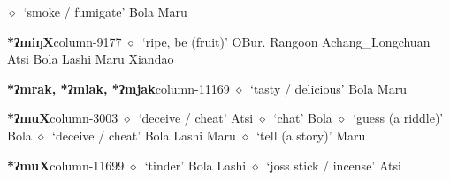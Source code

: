          $\diamond$~`smoke / fumigate'
         Bola 
\hspace{1ex}
         Maru 
  \item {\footnotesize \textbf{*ʔmiŋX}}{\tiny column-9177}
         $\diamond$~`ripe, be (fruit)'
         OBur. 
\hspace{1ex}
         Rangoon 
\hspace{1ex}
         Achang\_Longchuan 
\hspace{1ex}
         Atsi 
\hspace{1ex}
         Bola 
\hspace{1ex}
         Lashi 
\hspace{1ex}
         Maru 
\hspace{1ex}
         Xiandao 
  \item {\footnotesize \textbf{*ʔmrak, *ʔmlak, *ʔmjak}}{\tiny column-11169}
         $\diamond$~`tasty / delicious'
         Bola 
\hspace{1ex}
         Maru 
  \item {\footnotesize \textbf{*ʔmuX}}{\tiny column-3003}
         $\diamond$~`deceive / cheat'
         Atsi 
\hspace{1ex}
         $\diamond$~`chat'
         Bola 
\hspace{1ex}
         $\diamond$~`guess (a riddle)'
         Bola 
\hspace{1ex}
         $\diamond$~`deceive / cheat'
         Bola 
\hspace{1ex}
         Lashi 
\hspace{1ex}
         Maru 
\hspace{1ex}
         $\diamond$~`tell (a story)'
         Maru 
  \item {\footnotesize \textbf{*ʔmuX}}{\tiny column-11699}
         $\diamond$~`tinder'
         Bola 
\hspace{1ex}
         Lashi 
\hspace{1ex}
         $\diamond$~`joss stick / incense'
         Atsi 
